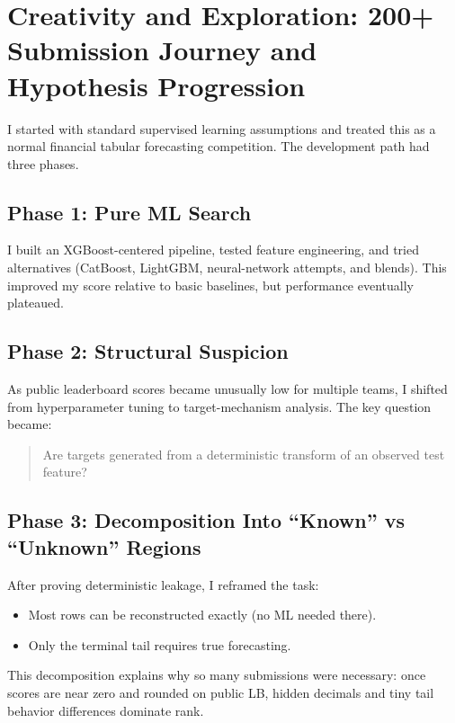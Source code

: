 \section{Creativity and Exploration: 200+ Submission Journey and Hypothesis Progression}

I started with standard supervised learning assumptions and treated this as a normal financial tabular forecasting competition. The development path had three phases.

\subsection{Phase 1: Pure ML Search}
I built an XGBoost-centered pipeline, tested feature engineering, and tried alternatives (CatBoost, LightGBM, neural-network attempts, and blends). This improved my score relative to basic baselines, but performance eventually plateaued.

\subsection{Phase 2: Structural Suspicion}
As public leaderboard scores became unusually low for multiple teams, I shifted from hyperparameter tuning to target-mechanism analysis. The key question became:
\begin{quote}
Are targets generated from a deterministic transform of an observed test feature?
\end{quote}

\subsection{Phase 3: Decomposition Into ``Known'' vs ``Unknown'' Regions}
After proving deterministic leakage, I reframed the task:
\begin{itemize}[leftmargin=1.5em]
  \item Most rows can be reconstructed exactly (no ML needed there).
  \item Only the terminal tail requires true forecasting.
\end{itemize}

This decomposition explains why so many submissions were necessary: once scores are near zero and rounded on public LB, hidden decimals and tiny tail behavior differences dominate rank.

